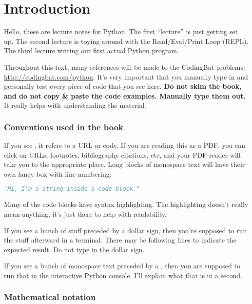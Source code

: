 \chapter{Introduction}

Hello, these are lecture notes for Python. The first ``lecture'' is
just getting set up. The second lecture is toying around with the
Read/Eval/Print Loop (REPL). The third lecture writing our first
actual Python program.

Throughout this text, many references will be made to the CodingBat
problems: \url{http://codingbat.com/python}. It's very important that
you manually type in and personally test every piece of code that you
see here. \textbf{Do not skim the book, and do not copy \& paste the
  code examples. Manually type them out.} It really helps with
understanding the material.

\subsection{Conventions used in the book}

If you see , it refers to a URL or code. If you
are reading this as a PDF, you can click on URLs, footnotes,
bibliography citations, etc, and your PDF reader will take you to the
appropriate place. Long blocks of monospace text will have their own
fancy box with line numbering:

\begin{lstlisting}[language=Python]
"Hi, I'm a string inside a code block."
\end{lstlisting}

Many of the code blocks have syntax highlighting. The highlighting
doesn't really mean anything, it's just there to help with
readability. 

If you see a bunch of stuff preceded by a
dollar sign, then you're supposed to run the stuff afterward in a
terminal. There may be following lines to indicate the expected
result. Do not type in the dollar sign.



If you see a bunch of monospace text preceded by a \code{>>>}, then
you are supposed to run that in the interactive Python console. I'll
explain what that is in a second.

\subsection{Mathematical notation}

